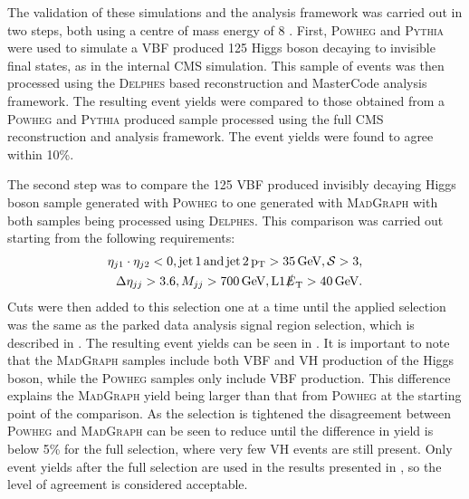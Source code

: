 The validation of these simulations and the analysis framework was carried out in two steps, both using a centre of mass energy of 8 \TeV. First, \textsc{Powheg} and \textsc{Pythia} were used to simulate a \ac{VBF} produced 125 \GeV Higgs boson decaying to invisible final states, as in the internal CMS simulation. This sample of events was then processed using the \textsc{Delphes} based reconstruction and MasterCode analysis framework. The resulting event yields were compared to those obtained from a \textsc{Powheg} and \textsc{Pythia} produced sample processed using the full CMS reconstruction and analysis framework. The event yields were found to agree within 10\%.


The second step was to compare the 125 \GeV \ac{VBF} produced invisibly decaying Higgs boson sample generated with \textsc{Powheg} to one generated with \textsc{MadGraph} with both samples being processed using \textsc{Delphes}. This comparison was carried out starting from the following requirements:
\begin{align}
  \label{eq:dmvalstart}
  \begin{split}
\eta_{j1}\cdot\eta_{j2}<0, \rm{jet\,1\,and\,jet\,2\,}p_{\mathrm{T}}>35 \,\text{Ge\hspace{-.08em}V}, \mathcal{S}>3,\\ \Delta\eta_{jj}>3.6, M_{jj}>700 \,\text{Ge\hspace{-.08em}V}, \rm{L1} \slashed{E}_{\mathrm{T}}>40 \,\text{Ge\hspace{-.08em}V}.
  \end{split}
\end{align}
Cuts were then added to this selection one at a time until the applied selection was the same as the parked data analysis signal region selection, which is described in . The resulting event yields can be seen in . It is important to note that the \textsc{MadGraph} samples include both \ac{VBF} and \ac{VH} production of the Higgs boson, while the \textsc{Powheg} samples only include \ac{VBF} production. This difference explains the \textsc{MadGraph} yield being larger than that from \textsc{Powheg} at the starting point of the comparison. As the selection is tightened the disagreement between \textsc{Powheg} and \textsc{MadGraph} can be seen to reduce until the difference in yield is below 5\% for the full selection, where very few \ac{VH} events are still present. Only event yields after the full selection are used in the results presented in , so the level of agreement is considered acceptable.

